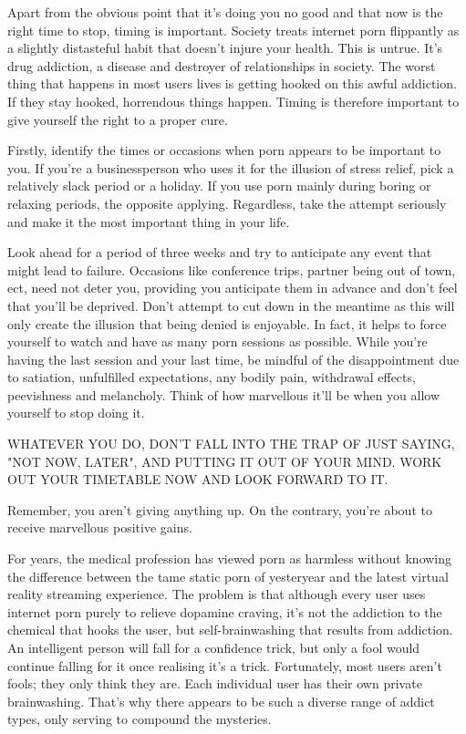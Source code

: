 \documentclass[easypeasy.tex]{subfiles}
\begin{document}
Apart from the obvious point that it's doing you no good and that now is the right time to stop, timing is important. Society treats internet porn flippantly as a slightly distasteful habit that doesn't injure your health. This is untrue. It's drug addiction, a disease and destroyer of relationships in society. The worst thing that happens in most users lives is getting hooked on this awful addiction. If they stay hooked, horrendous things happen. Timing is therefore important to give yourself the right to a proper cure.

Firstly, identify the times or occasions when porn appears to be important to you. If you're a businessperson who uses it for the illusion of stress relief, pick a relatively slack period or a holiday. If you use porn mainly during boring or relaxing periods, the opposite applying. Regardless, take the attempt seriously and make it the most important thing in your life.

Look ahead for a period of three weeks and try to anticipate any event that might lead to failure. Occasions like conference trips, partner being out of town, ect, need not deter you, providing you anticipate them in advance and don't feel that you'll be deprived. Don't attempt to cut down in the meantime as this will only create the illusion that being denied is enjoyable. In fact, it helps to force yourself to watch and have as many porn sessions as possible. While you're having the last session and your last time, be mindful of the disappointment due to satiation, unfulfilled expectations, any bodily pain, withdrawal effects, peevishness and melancholy. Think of how marvellous it'll be when you allow yourself to stop doing it.

{\large WHATEVER YOU DO, DON'T FALL INTO THE TRAP OF JUST SAYING, "NOT NOW, LATER", AND PUTTING IT OUT OF YOUR MIND. WORK OUT YOUR TIMETABLE NOW AND LOOK FORWARD TO IT.}

Remember, you aren't giving anything up. On the contrary, you're about to receive marvellous positive gains.

For years, the medical profession has viewed porn as harmless without knowing the difference between the tame static porn of yesteryear and the latest virtual reality streaming experience. The problem is that although every user uses internet porn purely to relieve dopamine craving, it's not the addiction to the chemical that hooks the user, but self-brainwashing that results from addiction. An intelligent person will fall for a confidence trick, but only a fool would continue falling for it once realising it's a trick. Fortunately, most users aren't fools; they only think they are. Each individual user has their own private brainwashing. That's why there appears to be such a diverse range of addict types, only serving to compound the mysteries.
\end{document}
